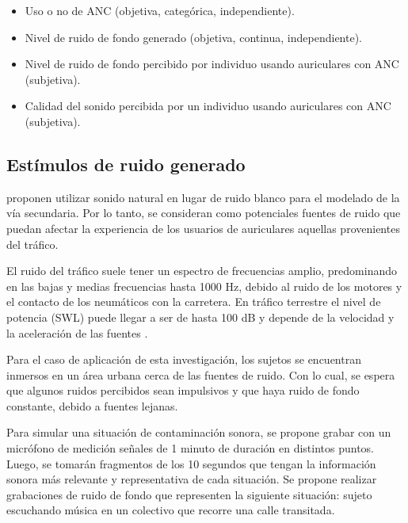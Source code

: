 \documentclass[a4paper,12pt]{article}
\begin{document}
\begin{itemize}[label=\textbullet]
    \item Uso o no de ANC (objetiva, categórica, independiente).

    \item Nivel de ruido de fondo generado (objetiva, continua, independiente).

    \item Nivel de ruido de fondo percibido por individuo usando auriculares con ANC (subjetiva).

    \item Calidad del sonido percibida por un individuo usando auriculares con ANC (subjetiva).
\end{itemize}

\subsection{Estímulos de ruido generado}
\label{sec:generatedNoise}

\textcite[][3]{Kuo2018} proponen utilizar sonido natural en lugar de ruido blanco para el modelado de la vía secundaria.
Por lo tanto, se consideran como potenciales fuentes de ruido que puedan afectar la experiencia de los usuarios de auriculares aquellas provenientes del tráfico.

El ruido del tráfico suele tener un espectro de frecuencias amplio, predominando en las bajas y medias frecuencias hasta 1000 $\si{\hertz}$, debido al ruido de los motores y el contacto de los neumáticos con la carretera.
En tráfico terrestre el nivel de potencia (SWL) puede llegar a ser de hasta 100 \si{\deci \bel} y depende de la velocidad y la aceleración de las fuentes \parencite{Can2010}.

Para el caso de aplicación de esta investigación, los sujetos se encuentran inmersos en un área urbana cerca de las fuentes de ruido.
Con lo cual, se espera que algunos ruidos percibidos sean impulsivos y que haya ruido de fondo constante, debido a fuentes lejanas.

Para simular una situación de contaminación sonora, se propone grabar con un micrófono de medición señales de 1 minuto de duración en distintos puntos.
Luego, se tomarán fragmentos de los 10 segundos que tengan la información sonora más relevante y representativa de cada situación.
Se propone realizar grabaciones de ruido de fondo que representen la siguiente situación: sujeto escuchando música en un colectivo que recorre una calle transitada.
\end{document}
